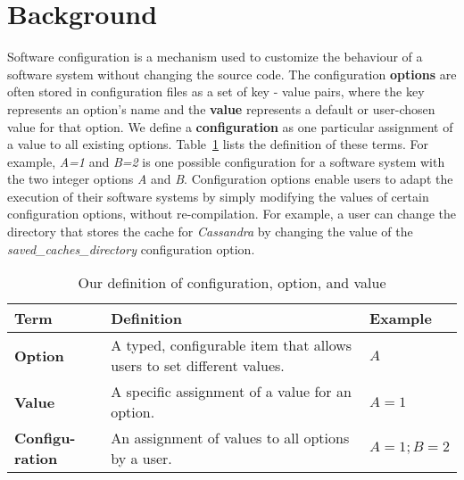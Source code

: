
\section{Background}
\label{sec:back}



Software configuration is a mechanism used to customize the behaviour of a software system without changing the source code. The configuration \textbf{options} are often stored in configuration files as a set of key - value pairs, where the key represents an option's name and the \textbf{value} represents a default or user-chosen value for that option. We define a \textbf{configuration} as one particular assignment of a value to all existing options. Table~\ref{tab:terms} lists the definition of these terms. For example, \emph{A=1} and \emph{B=2} is one possible configuration for a software system with the two integer options \emph{A} and \emph{B}. Configuration options enable users to adapt the execution of their software systems by simply modifying the values of certain configuration options, without re-compilation. For example, a user can change the directory that stores the cache for \emph{Cassandra} by changing the value of the \textit{saved\_caches\_directory} configuration option.%

\begin{table}[t]
    \centering
    \footnotesize
    \tabcolsep=0.05cm
    \caption{Our definition of configuration, option, and value}
    \begin{tabular}{|p{1.1cm}|p{5.8cm}|l|}
        \hline
        Term & Definition & Example \\
        \hline
        \textbf{Option}  & A typed, configurable item that allows users to set different values. & $A$ \\ \hline
        \textbf{Value} & A specific assignment of a value for an option. & $A = 1$ \\ \hline
        \textbf{Configu-ration} & An assignment of values to all options by a user. & $A = 1; B = 2$ \\ 
        \hline
    \end{tabular}
    \label{tab:terms}
\end{table}


